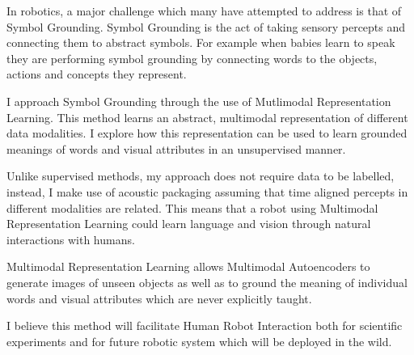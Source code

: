 In robotics, a major challenge which many have attempted to address is that of Symbol Grounding. Symbol Grounding is the act of taking sensory percepts and connecting them to abstract symbols. For example when babies learn to speak they are performing symbol grounding by connecting words to the objects, actions and concepts they represent.

I approach Symbol Grounding through the use of Mutlimodal Representation Learning. This method learns an abstract, multimodal representation of different data modalities. I explore how this representation can be used to learn grounded meanings of words and visual attributes in an unsupervised manner.

Unlike supervised methods, my approach does not require data to be labelled, instead, I make use of acoustic packaging assuming that time aligned percepts in different modalities are related. This means that a robot using Multimodal Representation Learning could learn language and vision through natural interactions with humans.


Multimodal Representation Learning allows Multimodal Autoencoders to generate images of unseen objects as well as to ground the meaning of individual words and visual attributes which are never explicitly taught. 

I believe this method will facilitate Human Robot Interaction both for scientific experiments and for future robotic system which will be deployed in the wild.

